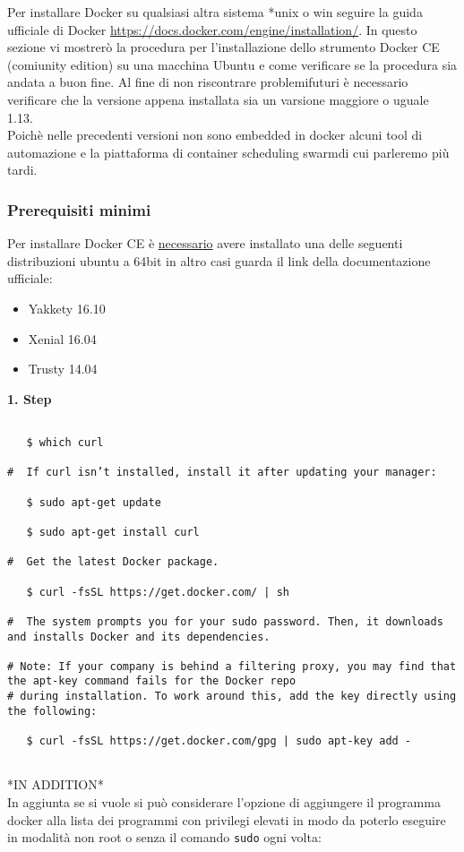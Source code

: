 Per installare Docker su qualsiasi altra sistema *unix o win seguire la guida ufficiale di Docker \href{https://docs.docker.com/engine/installation/}{https://docs.docker.com/engine/installation/}.
In questo sezione vi mostrerò la procedura per l'installazione dello strumento Docker CE (comiunity edition) su una macchina Ubuntu e come verificare se la procedura sia andata a buon fine. Al fine di non riscontrare problemifuturi è necessario verificare che la versione appena installata sia un varsione maggiore o uguale 1.13.\\Poichè nelle precedenti versioni non sono embedded in docker alcuni tool di automazione e la piattaforma di container scheduling swarmdi cui parleremo più tardi.
\subsubsection {Prerequisiti minimi}Per installare Docker CE è \underline{necessario} avere installato una delle seguenti distribuzioni ubuntu a 64bit in altro casi guarda il link della documentazione ufficiale:
\begin{itemize}
	\item Yakkety 16.10
	\item Xenial 16.04
	\item Trusty 14.04
\end{itemize}
\textbf{1. Step}
\begin{verbatim}

   $ which curl

#  If curl isn’t installed, install it after updating your manager:

   $ sudo apt-get update
   
   $ sudo apt-get install curl

#  Get the latest Docker package.

   $ curl -fsSL https://get.docker.com/ | sh

#  The system prompts you for your sudo password. Then, it downloads and installs Docker and its dependencies.

# Note: If your company is behind a filtering proxy, you may find that the apt-key command fails for the Docker repo
# during installation. To work around this, add the key directly using the following:

   $ curl -fsSL https://get.docker.com/gpg | sudo apt-key add -
     
\end{verbatim}
*IN ADDITION*\\In aggiunta se si vuole si può considerare l'opzione di aggiungere il programma docker alla lista dei programmi con privilegi elevati in modo da poterlo eseguire in modalità non root o senza il comando \texttt{sudo} ogni volta:

